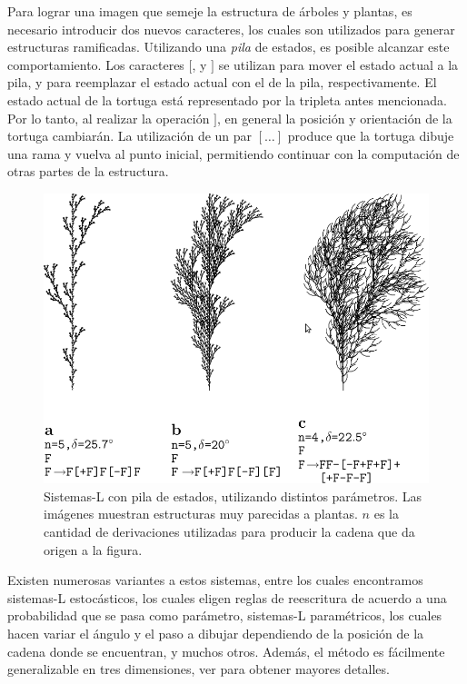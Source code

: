 Para lograr una imagen que semeje la estructura de árboles y plantas, es necesario introducir dos nuevos caracteres, los cuales son utilizados para generar estructuras ramificadas.
Utilizando una {\em pila} de estados, es posible alcanzar este comportamiento.
Los caracteres $[$, y $]$ se utilizan para mover el estado actual a la pila, y para reemplazar el estado actual con el de la pila, respectivamente.
El estado actual de la tortuga está representado por la tripleta antes mencionada.
Por lo tanto, al realizar la operación $]$, en general la posición y orientación de la tortuga cambiarán.
La utilización de un par $[\dots]$ produce que la tortuga dibuje una rama y vuelva al punto inicial, permitiendo continuar con la computación de otras partes de la estructura.

\begin{figure}
\center
\includegraphics[width=13cm]{figures/sistemalcorchete}
\caption{Sistemas-L con pila de estados, utilizando distintos parámetros. Las imágenes muestran estructuras muy parecidas a plantas. $n$ es la cantidad de derivaciones utilizadas para producir la cadena que da origen a la figura.}
\label{fg:sistemasLcorchete}
\end{figure}


Existen numerosas variantes a estos sistemas, entre los cuales encontramos sistemas-L estocásticos, los cuales eligen reglas de reescritura de acuerdo a una probabilidad que se pasa como parámetro, sistemas-L paramétricos, los cuales hacen variar el ángulo y el paso a dibujar dependiendo de la posición de la cadena donde se encuentran, y muchos otros.
Además, el método es fácilmente generalizable en tres dimensiones, ver \cite{Prusinkiewicz1990} para obtener mayores detalles.

